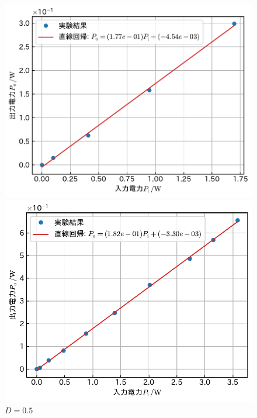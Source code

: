 \documentclass[1_power_supply.tex]{subfiles}
\begin{document}
\begin{figure}[htbp]
      \vspace{1.5mm}
      \begin{minipage}{0.45\columnwidth}
        \centering
        \includegraphics[width=0.8\columnwidth]{2_40p.pdf}
        \caption{$D=0.4$}\label{fig:2_40p}
      \end{minipage}
      \begin{minipage}{0.45\columnwidth}
        \centering
        \includegraphics[width=0.8\columnwidth]{2_50p.pdf}
        \caption{$D=0.5$}\label{fig:2_50p}
      \end{minipage}


\end{figure}
\end{document}
